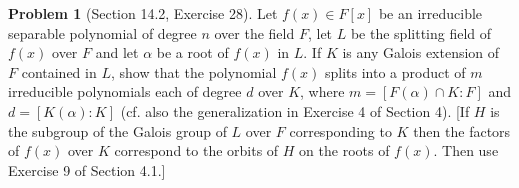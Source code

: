\documentclass{amsart}
\numberwithin{equation}{section}
\theoremstyle{definition}
\newtheorem{problem}[thm]{Problem}
\begin{document}
\begin{problem}[Section 14.2, Exercise 28]
Let \(f(x) \in F[x]\) be an irreducible separable polynomial of degree \(n\) over the field \(F\), let \(L\) be the splitting field of \(f(x)\) over \(F\) and let \(\alpha\) be a root of \(f(x)\) in \(L\). If \(K\) is any Galois extension of \(F\) contained in \(L\), show that the polynomial \(f(x)\) splits into a product of \(m\) irreducible polynomials each of degree \(d\) over \(K\), where \(m=[F(\alpha) \cap K: F]\) and \(d=[K(\alpha): K]\) (cf. also the generalization in Exercise 4 of Section 4). [If \(H\) is the subgroup of the Galois group of \(L\) over \(F\) corresponding to \(K\) then the factors of \(f(x)\) over \(K\) correspond to the orbits of \(H\) on the roots of \(f(x)\). Then use Exercise 9 of Section 4.1.]
\end{problem}



\end{document}
